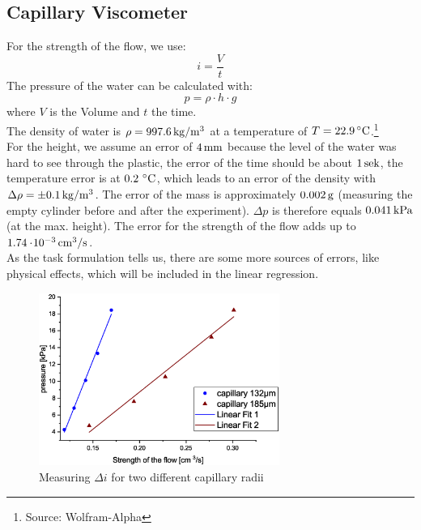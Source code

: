 \subsection{Capillary Viscometer} \label{sec:aufgabe3}
For the strength of the flow, we use:
\begin{equation}
i = \frac{V}{t}
\end{equation}
The pressure of the water can be calculated with:
\begin{equation}
p = \rho \cdot h \cdot g
\end{equation}
where $V$ is the Volume and $t$ the time.\\
The density of water is $\rho = \unit[997.6]{kg/m^3}$ at a temperature of $T = 22.9 \C$.\footnote{Source: Wolfram-Alpha}\\
For the height, we assume an error of $\unit[4]{mm}$ because the level of the water was hard to see through the plastic, the error of the time should be about $\unit[1]{sek}$, the temperature error is at $\unit[0.2]{\C}$, which leads to an error of the density with $\Delta \rho = \pm \unit[0.1]{kg/m^3}$. The error of the mass is approximately $\unit[0.002]{g}$ (measuring the empty cylinder before and after the experiment). $\Delta p$ is therefore equals $\unit[0.041]{kPa}$ (at the max. height).
The error for the strength of the flow adds up to $\unit[1.74\e{-3}]{cm^3/s}$.\\As the task formulation tells us, there are some more sources of errors, like physical effects, which will be included in the linear regression.

\begin{figure}
\begin{center}
\includegraphics[width=0.7\textwidth]{Bilder/aufgabe2.eps}
\caption{Measuring $\Delta i$ for two different capillary radii}
\label{fig:aufgabe2}
\end{center}
\end{figure}

